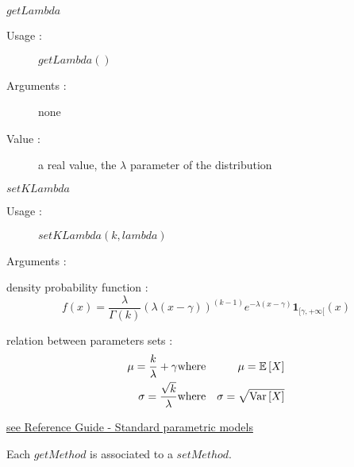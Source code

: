 \begin{description}
\begin{description}
  \item $getLambda$
    \begin{description}
    \item[Usage :] $getLambda()$
    \item[Arguments :] none
    \item[Value :]  a real value, the $\lambda$ parameter of the  distribution
    \end{description}
    \bigskip


  \item $setKLambda$
    \begin{description}
    \item[Usage :] $setKLambda(k, lambda)$
    \item[Arguments :]
    \end{description}

  \end{description}

\item[Details :]  \rule{0pt}{1em}
  \begin{description}
  \item density probability function :
    $$
    f(x) = \frac{\lambda}{\Gamma(k)}(\lambda(x-\gamma))^{(k-1)}
    e^{-\lambda(x-\gamma)}\boldsymbol{1}_{[\gamma,+\infty[}(x)
    $$
  \item relation between parameters sets :
    \begin{eqnarray*}
      \mu  =   \frac{k}{\lambda}+\gamma                                                 &  \mbox{where}& \mu ={\mathbb E}\left[ X \right] \\
      \sigma  = \frac{\sqrt{k}}{\lambda}                &  \mbox{where}& \sigma =\sqrt{{\rm Var}\left[ X \right] }
    \end{eqnarray*}

  \end{description}

\item[Links :]  \rule{0pt}{1em}
  \href{OpenTURNS_ReferenceGuide.pdf}{see Reference Guide - Standard parametric models}
\end{description}

Each  $getMethod$  is associated to a $setMethod$.

